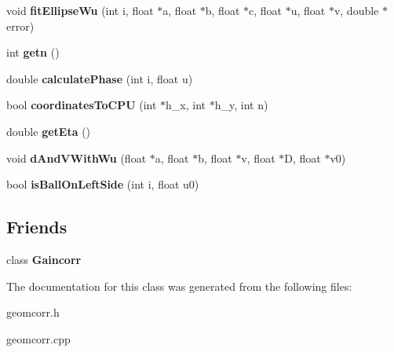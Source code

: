 \begin{DoxyCompactItemize}
\item 
void {\bfseries fit\+Ellipse\+Wu} (int i, float $\ast$a, float $\ast$b, float $\ast$c, float $\ast$u, float $\ast$v, double $\ast$error)\hypertarget{classGeomcorr_a2af6517ab0310f41125b319c82cffe2f}{}\label{classGeomcorr_a2af6517ab0310f41125b319c82cffe2f}

\item 
int {\bfseries getn} ()\hypertarget{classGeomcorr_a28274f589b43b4953ecb26acabb8f01f}{}\label{classGeomcorr_a28274f589b43b4953ecb26acabb8f01f}

\item 
double {\bfseries calculate\+Phase} (int i, float u)\hypertarget{classGeomcorr_adefc263fdcec001ce78713f041fcb00d}{}\label{classGeomcorr_adefc263fdcec001ce78713f041fcb00d}

\item 
bool {\bfseries coordinates\+To\+C\+PU} (int $\ast$h\+\_\+x, int $\ast$h\+\_\+y, int n)\hypertarget{classGeomcorr_a2db2d333164befead593c6ba9a125d8e}{}\label{classGeomcorr_a2db2d333164befead593c6ba9a125d8e}

\item 
double {\bfseries get\+Eta} ()\hypertarget{classGeomcorr_a98c2856046a11d7f131e09dd1fa0d97b}{}\label{classGeomcorr_a98c2856046a11d7f131e09dd1fa0d97b}

\item 
void {\bfseries d\+And\+V\+With\+Wu} (float $\ast$a, float $\ast$b, float $\ast$v, float $\ast$D, float $\ast$v0)\hypertarget{classGeomcorr_a570f0ec4cd5db6d8d0d97264d2f3afca}{}\label{classGeomcorr_a570f0ec4cd5db6d8d0d97264d2f3afca}

\item 
bool {\bfseries is\+Ball\+On\+Left\+Side} (int i, float u0)\hypertarget{classGeomcorr_a18255dc56f87a2fea7ed927f923bf3d3}{}\label{classGeomcorr_a18255dc56f87a2fea7ed927f923bf3d3}

\end{DoxyCompactItemize}
\subsection*{Friends}
\begin{DoxyCompactItemize}
\item 
class {\bfseries Gaincorr}\hypertarget{classGeomcorr_a851375f64345af5451f69b4299b1b6cc}{}\label{classGeomcorr_a851375f64345af5451f69b4299b1b6cc}

\end{DoxyCompactItemize}


The documentation for this class was generated from the following files\+:\begin{DoxyCompactItemize}
\item 
geomcorr.\+h\item 
geomcorr.\+cpp\end{DoxyCompactItemize}
